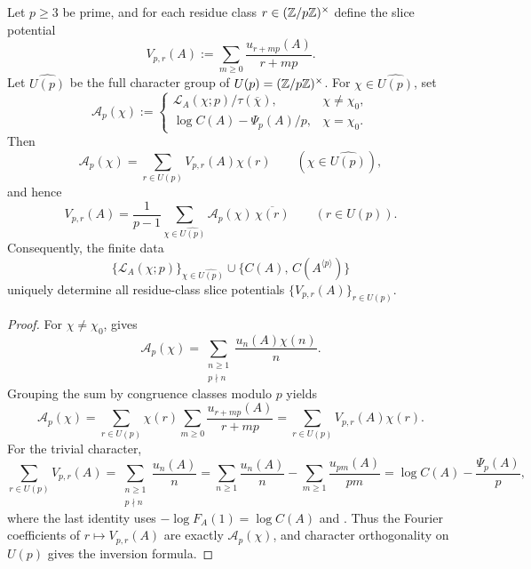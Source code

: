 \begin{theorem}
  \label{thm:finite-part-dirichlet-character-inversion-prime}
  Let \(p\ge 3\) be prime, and for each residue class
  \(r\in(\mathbb{Z}/p\mathbb{Z})^\times\) define the slice potential
  \[
    V_{p,r}(A):=\sum_{m\ge 0}\frac{u_{r+mp}(A)}{r+mp}.
  \]
  Let \(\widehat{U(p)}\) be the full character group of
  \(U(p)=(\mathbb{Z}/p\mathbb{Z})^\times\). For \(\chi\in\widehat{U(p)}\), set
  \[
    \mathscr A_p(\chi):=
    \begin{cases}
      \mathcal L_A(\chi;p)/\tau(\overline{\chi}),
        & \chi\neq \chi_0,\\[6pt]
      \log C(A)-\Psi_p(A)/p,
        & \chi=\chi_0.
    \end{cases}
  \]
  Then
  \[
    \mathscr A_p(\chi)
    =\sum_{r\in U(p)}V_{p,r}(A)\chi(r)
    \qquad (\chi\in\widehat{U(p)}),
  \]
  and hence
  \[
    V_{p,r}(A)
    =\frac{1}{p-1}\sum_{\chi\in\widehat{U(p)}}
      \mathscr A_p(\chi)\,\overline{\chi(r)}
    \qquad (r\in U(p)).
  \]
  Consequently, the finite data
  \[
    \bigl\{\mathcal L_A(\chi;p)\bigr\}_{\chi\in\widehat{U(p)}}
    \cup \{C(A),\,C(A^{\langle p\rangle})\}
  \]
  uniquely determine all residue-class slice potentials
  \(\{V_{p,r}(A)\}_{r\in U(p)}\).
\end{theorem}

\begin{proof}
  For \(\chi\neq \chi_0\),
   gives
  \[
    \mathscr A_p(\chi)
    =\sum_{\substack{n\ge 1\\ p\nmid n}}
      \frac{u_n(A)\chi(n)}{n}.
  \]
  Grouping the sum by congruence classes modulo \(p\) yields
  \[
    \mathscr A_p(\chi)
    =\sum_{r\in U(p)}\chi(r)
      \sum_{m\ge 0}\frac{u_{r+mp}(A)}{r+mp}
    =\sum_{r\in U(p)}V_{p,r}(A)\chi(r).
  \]
  For the trivial character,
  \[
    \sum_{r\in U(p)}V_{p,r}(A)
    =\sum_{\substack{n\ge 1\\ p\nmid n}}\frac{u_n(A)}{n}
    =\sum_{n\ge 1}\frac{u_n(A)}{n}
      -\sum_{m\ge 1}\frac{u_{pm}(A)}{pm}
    =\log C(A)-\frac{\Psi_p(A)}{p},
  \]
  where the last identity uses
  \(-\log F_A(1)=\log C(A)\) and
  . Thus the
  Fourier coefficients of \(r\mapsto V_{p,r}(A)\) are exactly
  \(\mathscr A_p(\chi)\), and character orthogonality on \(U(p)\) gives
  the inversion formula.
\end{proof}

